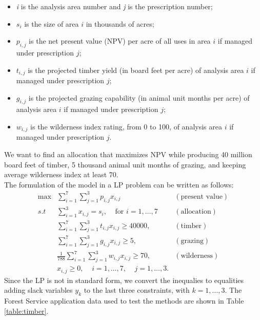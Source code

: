 \documentclass[a4paper,10 pt,titlepage,twoside]{book}
\theoremstyle{plain}
\theoremstyle{definition}
\theoremstyle{remark}
\begin{document}
{{\begin{itemize}
	\item \textit{i} is the analysis area number and \textit{j} is the prescription number;
	\item $s_{i}$ is the size of area $i$ in thousands of acres;
	\item $p_{i,j}$ is the net present value (NPV) per acre of all uses in area $i$ if managed under prescription $j$;
	\item $t_{i,j}$ is the projected timber yield (in board feet per acre) of analysis area $i$ if managed under prescription $j$;
	\item $g_{i,j}$ is the projected grazing capability (in animal unit months per acre) of analysis area $i$ if managed under prescription $j$;
	\item $w_{i,j}$ is the wilderness index rating, from 0 to 100, of analysis area $i$ if managed under prescription $j$.
\end{itemize}
We want to find an allocation that maximizes NPV while producing 40 million board feet of timber, 5 thousand animal unit months of grazing, and keeping average wilderness index at least 70.\\
The formulation of the model in a LP problem can be written as follows:
\begin{align*}
\max&\sum_{i=1}^{7}\sum_{j=1}^{3} p_{i,j}x_{i,j}&(\text{present value})\\
s.t\;\; & \sum_{i=1}^{3}x_{i,j}=s_{i},\;\;\;\;\text{for }i = 1, \dots,7&(\text{allocation})\\
&\sum_{i=1}^{7}\sum_{j=1}^{3} t_{i,j}x_{i,j}\geq 40000,&(\text{timber})\\
&\sum_{i=1}^{7}\sum_{j=1}^{3} g_{i,j}x_{i,j}\geq5,&(\text{grazing})\\
&\frac{1}{788}\sum_{i=1}^{7}\sum_{j=1}^{3} w_{i,j}x_{i,j}\geq 70,&(\text{wilderness})\\
&x_{i,j}\geq 0, \;\;\;\;i = 1,\dots,7,\;\;\;\;j = 1,\dots,3.
\end{align*}
Since the LP is not in standard form, we convert the inequalies to equalities adding slack variables $y_{k}$ to the last three constraints, with $k = 1, \dots, 3$. The Forest Service application data used to test the methods are shown in Table \ref{table:timber}.
\begin{table}[]
	\begin{tabular}{cccllll}
		\hline

\end{tabular}
\end{table}}}
\end{document}
